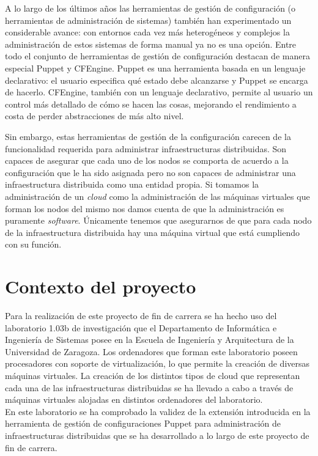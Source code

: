 A lo largo de los últimos años las herramientas de gestión de configuración (o herramientas de administración de sistemas) también han experimentado un considerable avance: con entornos cada vez más heterogéneos y complejos la administración de estos sistemas de forma manual ya no es una opción. Entre todo el conjunto de herramientas de gestión de configuración destacan de manera especial Puppet y CFEngine. Puppet es una herramienta basada en un lenguaje declarativo: el usuario especifica qué estado debe alcanzarse y Puppet se encarga de hacerlo. CFEngine, también con un lenguaje declarativo, permite al usuario un control más detallado de cómo se hacen las cosas, mejorando el rendimiento a costa de perder abstracciones de más alto nivel.

Sin embargo, estas herramientas de gestión de la configuración carecen de la funcionalidad requerida para administrar infraestructuras distribuidas. Son capaces de asegurar que cada uno de los nodos se comporta de acuerdo a la configuración que le ha sido asignada pero no son capaces de administrar una infraestructura distribuida como una entidad propia. Si tomamos la administración de un \emph{cloud} como la administración de las máquinas virtuales que forman los nodos del mismo nos damos cuenta de que la administración es puramente \emph{software}. Únicamente tenemos que asegurarnos de que para cada nodo de la infraestructura distribuida hay una máquina virtual que está cumpliendo con su función.\\


\section{Contexto del proyecto}

Para la realización de este proyecto de fin de carrera se ha hecho uso del laboratorio 1.03b de investigación que el Departamento de Informática e Ingeniería de Sistemas posee en la Escuela de Ingeniería y Arquitectura de la Universidad de Zaragoza. Los ordenadores que forman este laboratorio poseen procesadores con soporte de virtualización, lo que permite la creación de diversas máquinas virtuales. La creación de los distintos tipos de cloud que representan cada una de las infraestructuras distribuidas se ha llevado a cabo a través de máquinas virtuales alojadas en distintos ordenadores del laboratorio.\\

En este laboratorio se ha comprobado la validez de la extensión introducida en la herramienta de gestión de configuraciones Puppet para administración de infraestructuras distribuidas que se ha desarrollado a lo largo de este proyecto de fin de carrera.


